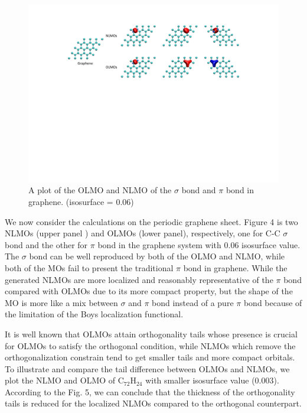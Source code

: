 \documentclass[aps,prl,reprint,amsmath,amssymb]{revtex4-1}
\begin{document}
\begin{figure}[hbpt]
\centering
\includegraphics[width=\textwidth]{figure_4.pdf}
\caption{A plot of the OLMO and NLMO of the $\sigma$ bond and $\pi$ bond in graphene. (isosurface = 0.06)}
\end{figure}

We now consider the calculations on the periodic graphene sheet.
Figure 4 is two NLMOs (upper panel ) and OLMOs (lower panel), respectively, one for C-C $\sigma$ bond and the other for $\pi$ bond in the graphene system with 0.06 isosurface value.
The $\sigma$ bond can be well reproduced by both of the OLMO and NLMO, while both of the MOs fail to present the traditional $\pi$ bond in graphene.
While the generated NLMOs are more localized and reasonably representative of the $\pi$ bond compared with OLMOs due to its more compact property, but the shape of the MO is more like a mix between $\sigma$ and $\pi$ bond instead of a pure $\pi$ bond because of the limitation of the Boys localization functional.

It is well known that OLMOs attain orthogonality tails whose presence is crucial for OLMOs to satisfy the orthogonal condition, while NLMOs which remove the orthogonalization constrain tend to get smaller tails and more compact orbitals. 
To illustrate and compare the tail difference between OLMOs and NLMOs, we plot the NLMO and OLMO of C$_{72}$H$_{24}$ with smaller isosurface value (0.003).
According to the Fig. 5, we can conclude that the thickness of the orthogonality tails is reduced for the localized NLMOs compared to the orthogonal counterpart.
\end{document}
